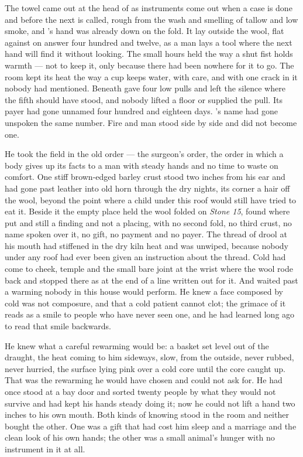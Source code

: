 
The towel came out at the head of  as instruments come out when a case is done and before the next is called, rough from the wash and smelling of tallow and low smoke, and 's hand was already down on the fold. It lay outside the wool, flat against  on answer four hundred and twelve, as a man lays a tool where the next hand will find it without looking. The small hours held  the way a shut fist holds warmth --- not to keep it, only because there had been nowhere for it to go. The room kept its heat the way a cup keeps water, with care, and with one crack in it nobody had mentioned. Beneath   gave four low pulls and left the silence where the fifth should have stood, and nobody lifted a floor or supplied the pull. Its payer had gone unnamed four hundred and eighteen days. 's name had gone unspoken the same number. Fire and man stood side by side and did not become one.

He took the field in the old order --- the surgeon's order, the order in which a body gives up its facts to a man with steady hands and no time to waste on comfort. One stiff brown-edged barley crust stood two inches from his ear and had gone past leather into old horn through the dry nights, its corner a hair off the wool, beyond the point where a child under this roof would still have tried to eat it. Beside it the empty place held the wool folded on \emph{Stone 15}, found where put and still a finding and not a placing, with no second fold, no third crust, no name spoken over it, no gift, no payment and no payer. The thread of drool at his mouth had stiffened in the dry kiln heat and was unwiped, because nobody under any roof had ever been given an instruction about the thread. Cold had come to cheek, temple and the small bare joint at the wrist where the wool rode back and stopped there as at the end of a line written out for it. And  waited past a warming nobody in this house would perform. He knew a face composed by cold was not composure, and that a cold patient cannot clot; the grimace of it reads as a smile to people who have never seen one, and he had learned long ago to read that smile backwards.

He knew what a careful rewarming would be: a basket set level out of the draught, the heat coming to him sideways, slow, from the outside, never rubbed, never hurried, the surface lying pink over a cold core until the core caught up. That was the rewarming he would have chosen and could not ask for. He had once stood at a bay door and sorted twenty people by what they would not survive and had kept his hands steady doing it; now he could not lift a hand two inches to his own mouth. Both kinds of knowing stood in the room and neither bought the other. One was a gift that had cost him sleep and a marriage and the clean look of his own hands; the other was a small animal's hunger with no instrument in it at all.

